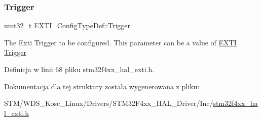 \subsubsection{\texorpdfstring{Trigger}{Trigger}}
{\footnotesize\ttfamily uint32\+\_\+t E\+X\+T\+I\+\_\+\+Config\+Type\+Def\+::\+Trigger}

The Exti Trigger to be configured. This parameter can be a value of \hyperlink{group___e_x_t_i___trigger}{E\+X\+TI Trigger} 

Definicja w linii 68 pliku stm32f4xx\+\_\+hal\+\_\+exti.\+h.



Dokumentacja dla tej struktury została wygenerowana z pliku\+:\begin{DoxyCompactItemize}
\item 
S\+T\+M/\+W\+D\+S\+\_\+\+Kosc\+\_\+\+Linux/\+Drivers/\+S\+T\+M32\+F4xx\+\_\+\+H\+A\+L\+\_\+\+Driver/\+Inc/\hyperlink{stm32f4xx__hal__exti_8h}{stm32f4xx\+\_\+hal\+\_\+exti.\+h}\end{DoxyCompactItemize}
